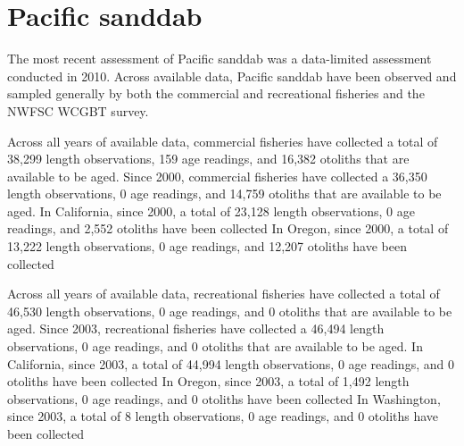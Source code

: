 \documentclass[11pt,
  english,
  letterpaper,
]{article}
\begin{document}

\hypertarget{pacific-sanddab}{%
\section{Pacific sanddab}\label{pacific-sanddab}}

\leavevmode\tagmcend\tagstructend


The most recent assessment of Pacific sanddab was a data-limited assessment conducted in 2010. Across available data, Pacific sanddab have been observed and sampled generally by both the commercial and recreational fisheries and the NWFSC WCGBT survey.

\leavevmode\tagmcend\tagstructend\par


Across all years of available data, commercial fisheries have collected a total of 38,299 length observations, 159 age readings, and 16,382 otoliths that are available to be aged. Since 2000, commercial fisheries have collected a 36,350 length observations, 0 age readings, and 14,759 otoliths that are available to be aged. In California, since 2000, a total of 23,128 length observations, 0 age readings, and 2,552 otoliths have been collected In Oregon, since 2000, a total of 13,222 length observations, 0 age readings, and 12,207 otoliths have been collected

\leavevmode\tagmcend\tagstructend\par


Across all years of available data, recreational fisheries have collected a total of 46,530 length observations, 0 age readings, and 0 otoliths that are available to be aged. Since 2003, recreational fisheries have collected a 46,494 length observations, 0 age readings, and 0 otoliths that are available to be aged. In California, since 2003, a total of 44,994 length observations, 0 age readings, and 0 otoliths have been collected In Oregon, since 2003, a total of 1,492 length observations, 0 age readings, and 0 otoliths have been collected In Washington, since 2003, a total of 8 length observations, 0 age readings, and 0 otoliths have been collected

\leavevmode\tagmcend\tagstructend\par
\end{document}
